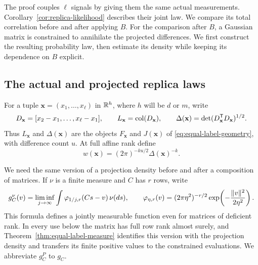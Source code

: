 The proof couples \(\ell\) signals by giving them the same actual
measurements.  Corollary~\ref{cor:replica-likelihood} describes their joint
law.  We compare its total correlation before and after applying \(B\).
For the comparison after \(B\), a Gaussian matrix is constrained to
annihilate the projected differences.  We first construct the resulting
probability law, then estimate its density while keeping its dependence
on \(B\) explicit.

\subsection{The actual and projected replica laws}

For a tuple \(\mathbf x=(x_1,\ldots,x_\ell)\) in \(\mathbb R^h\), where
\(h\) will be \(d\) or \(m\), write
\[
 D_{\mathbf x}=[x_2-x_1,\ldots,x_\ell-x_1],\qquad
 L_{\mathbf x}=\operatorname{col}(D_{\mathbf x}),\qquad
 \Delta(\mathbf x)=\det(D_{\mathbf x}^{\mathsf T}D_{\mathbf x})^{1/2}.
\]
Thus \(L_{\mathbf x}\) and \(\Delta(\mathbf x)\) are the objects
\(F_{\mathbf x}\) and \(J(\mathbf x)\) of
\eqref{eq:equal-label-geometry}, with difference count \(u\).  At full
affine rank define
\begin{equation}\label{syn:tuple-weight}
 w(\mathbf x)=(2\pi)^{-ku/2}\Delta(\mathbf x)^{-k}.
\end{equation}

We need the same version of a projection density before and after a
composition of matrices.  If \(\nu\) is a finite measure and \(C\) has
\(r\) rows, write
\begin{equation}\label{syn:density-version}
 g_C^\nu(v)=\liminf_{j\to\infty}
       \int\varphi_{1/j,r}(Cs-v)\,\nu(ds),\qquad
 \varphi_{\eta,r}(v)=(2\pi\eta^2)^{-r/2}
               \exp\!\left(-\frac{\lVert v\rVert^2}{2\eta^2}\right).
\end{equation}
This formula defines a jointly measurable function even for matrices of
deficient rank.  In every use below the matrix has full row rank almost
surely, and Theorem~\ref{thm:equal-label-measure} identifies this version
with the projection density and transfers its finite positive values to the
constrained evaluations.  We abbreviate \(g_C^P\) to \(g_C\).

